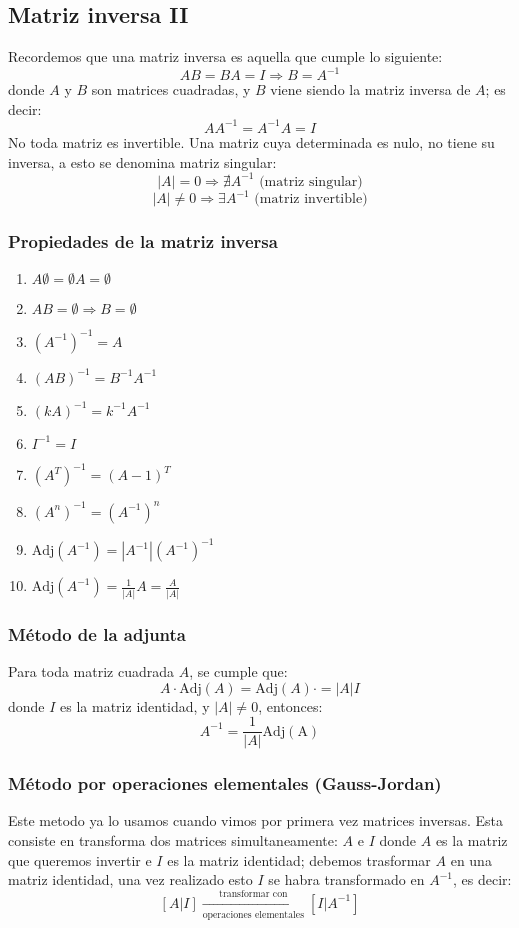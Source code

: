 \subsection*{Matriz inversa II}
Recordemos que una matriz inversa es aquella que cumple lo siguiente:
$$ AB=BA=I \Rightarrow B=A^{-1} $$
donde $A$ y $B$ son matrices cuadradas, y $B$ viene siendo la matriz inversa de $A$; es decir:
$$ AA^{-1}=A^{-1}A=I $$
No toda matriz es invertible. Una matriz cuya determinada es nulo, no tiene su inversa, a esto se denomina matriz singular:
$$ |A|=0 \Rightarrow \nexists A^{-1} \text{ (matriz singular)} $$
$$ |A|\ne0 \Rightarrow \exists A^{-1} \text{ (matriz invertible)} $$
\subsubsection*{Propiedades de la matriz inversa}
\begin{enumerate}
	\item $ A\emptyset=\emptyset A=\emptyset $
	\item $ AB=\emptyset \Rightarrow B=\emptyset $
	\item $ (A^{-1})^{-1}=A $
	\item $ (AB)^{-1}=B^{-1}A^{-1} $
	\item $ (kA)^{-1}=k^{-1}A^{-1} $
	\item $ I^{-1}=I $
	\item $ (A^T)^{-1}=(A-1)^T $
	\item $ (A^n)^{-1}=(A^{-1})^n $
	\item $ \mathrm{Adj}(A^{-1})=|A^{-1}|(A^{-1})^{-1} $
	\item $ \mathrm{Adj}(A^{-1})=\frac{1}{|A|}A=\frac{A}{|A|} $
\end{enumerate}
\subsubsection*{Método de la adjunta}
Para toda matriz cuadrada $A$, se cumple que:
$$ A\cdot\mathrm{Adj}(A)=\mathrm{Adj}(A)\cdot=|A|I $$
donde $I$ es la matriz identidad, y $|A|\ne 0$, entonces:
$$ A^{-1}=\frac{1}{|A|}\mathrm{Adj(A)} $$
\subsubsection*{Método por operaciones elementales (Gauss-Jordan)}
Este metodo ya lo usamos cuando vimos por primera vez matrices inversas. Esta consiste en transforma dos matrices simultaneamente: $A$ e $I$ donde $A$ es la matriz que queremos invertir e $I$ es la matriz identidad; debemos trasformar $A$ en una matriz identidad, una vez realizado esto $I$ se habra transformado en $A^{-1}$, es decir:
$$ [A|I]\xrightarrow[\text{operaciones elementales}]{\text{transformar con}}[I|A^{-1}] $$